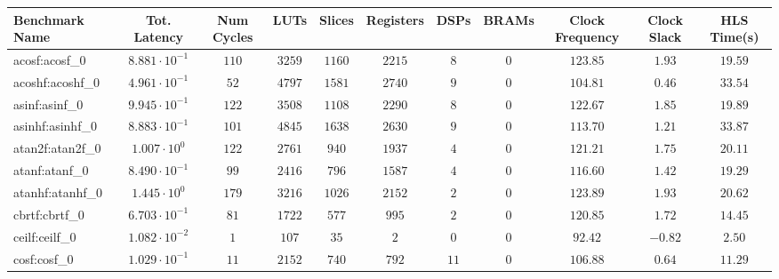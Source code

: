 \begin{tabular}{|l|c|c|c|c|c|c|c|c|c|c|}
\hline
Benchmark Name               & Tot. Latency            & Num Cycles & LUTs      & Slices    & Registers & DSPs    & BRAMs & Clock Frequency & Clock Slack & HLS Time(s) \\
\hline
acosf:acosf\_0               & $ 8.881 \cdot 10^{-1} $ & $ 110    $ & $ 3259  $ & $ 1160  $ & $ 2215  $ & $ 8   $ & $ 0 $ & $ 123.85      $ & $ 1.93    $ & $ 19.59   $ \\
acoshf:acoshf\_0             & $ 4.961 \cdot 10^{-1} $ & $ 52     $ & $ 4797  $ & $ 1581  $ & $ 2740  $ & $ 9   $ & $ 0 $ & $ 104.81      $ & $ 0.46    $ & $ 33.54   $ \\
asinf:asinf\_0               & $ 9.945 \cdot 10^{-1} $ & $ 122    $ & $ 3508  $ & $ 1108  $ & $ 2290  $ & $ 8   $ & $ 0 $ & $ 122.67      $ & $ 1.85    $ & $ 19.89   $ \\
asinhf:asinhf\_0             & $ 8.883 \cdot 10^{-1} $ & $ 101    $ & $ 4845  $ & $ 1638  $ & $ 2630  $ & $ 9   $ & $ 0 $ & $ 113.70      $ & $ 1.21    $ & $ 33.87   $ \\
atan2f:atan2f\_0             & $ 1.007 \cdot 10^{0}  $ & $ 122    $ & $ 2761  $ & $ 940   $ & $ 1937  $ & $ 4   $ & $ 0 $ & $ 121.21      $ & $ 1.75    $ & $ 20.11   $ \\
atanf:atanf\_0               & $ 8.490 \cdot 10^{-1} $ & $ 99     $ & $ 2416  $ & $ 796   $ & $ 1587  $ & $ 4   $ & $ 0 $ & $ 116.60      $ & $ 1.42    $ & $ 19.29   $ \\
atanhf:atanhf\_0             & $ 1.445 \cdot 10^{0}  $ & $ 179    $ & $ 3216  $ & $ 1026  $ & $ 2152  $ & $ 2   $ & $ 0 $ & $ 123.89      $ & $ 1.93    $ & $ 20.62   $ \\
cbrtf:cbrtf\_0               & $ 6.703 \cdot 10^{-1} $ & $ 81     $ & $ 1722  $ & $ 577   $ & $ 995   $ & $ 2   $ & $ 0 $ & $ 120.85      $ & $ 1.72    $ & $ 14.45   $ \\
ceilf:ceilf\_0               & $ 1.082 \cdot 10^{-2} $ & $ 1      $ & $ 107   $ & $ 35    $ & $ 2     $ & $ 0   $ & $ 0 $ & $ 92.42       $ & $ -0.82   $ & $ 2.50    $ \\
cosf:cosf\_0                 & $ 1.029 \cdot 10^{-1} $ & $ 11     $ & $ 2152  $ & $ 740   $ & $ 792   $ & $ 11  $ & $ 0 $ & $ 106.88      $ & $ 0.64    $ & $ 11.29   $ \\

\end{tabular}
